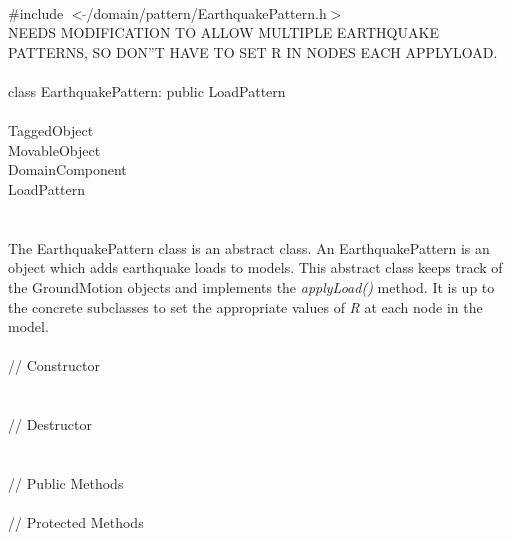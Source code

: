 
   \\
\indent \#include $<\tilde{ }$/domain/pattern/EarthquakePattern.h$>$  \\

NEEDS MODIFICATION TO ALLOW MULTIPLE EARTHQUAKE PATTERNS, SO DON''T
HAVE TO SET R IN NODES EACH APPLYLOAD.\\

  \\
\indent class EarthquakePattern: public LoadPattern  \\

 \\
\indent TaggedObject \\
\indent MovableObject \\
\indent\indent DomainComponent \\
\indent\indent\indent LoadPattern \\
\indent\indent\indent{} \\

 \\ 
\indent The EarthquakePattern class is an abstract class. An
EarthquakePattern is an object which adds earthquake loads to
models. This abstract class keeps track of the GroundMotion objects
and implements the {\em applyLoad()} method. It is up to the concrete
subclasses to set the appropriate values of {\em R} at each node in
the model.\\

 \\
\indent // Constructor \\ 
\\ \\
\indent // Destructor \\ 
\\  \\
\indent // Public Methods \\ 
 \\ 
\indent // Protected Methods \\ \\
 \\

